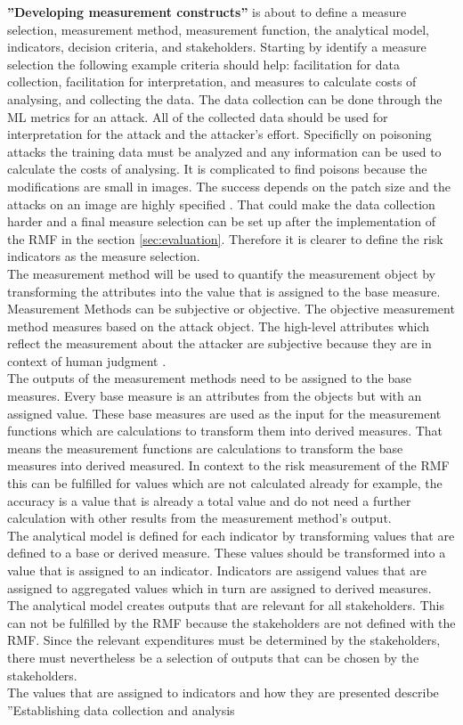 \textbf{''Developing measurement constructs''} is about to define a measure selection, measurement method, measurement function, the analytical model, indicators, decision criteria, and stakeholders. Starting by identify a measure selection the following example criteria should help: facilitation for data collection, facilitation for interpretation, and measures to calculate costs of analysing, and collecting the data. The data collection can be done through the ML metrics for an attack. All of the collected data should be used for interpretation for the attack and the attacker's effort. Specificlly on poisoning attacks the training data must be analyzed and any information can be used to calculate the costs of analysing. It is complicated to find poisons because the modifications are small in images. The success depends on the patch size and the attacks on an image are highly specified \cite{DBLP:conf/icml/SchwarzschildGG21}. That could make the data collection harder and a final measure selection can be set up after the implementation of the RMF in the section \ref{sec:evaluation}. Therefore it is clearer to define the risk indicators as the measure selection. \\ The measurement method will be used to quantify the measurement object by transforming the attributes into the value that is assigned to the base measure. Measurement Methods can be subjective or objective. The objective measurement method measures based on the attack object. The high-level attributes which reflect the measurement about the attacker are subjective because they are in context of human judgment \cite{DBLP:conf/crisis/DoynikovaNGK20}. \\ The outputs of the measurement methods need to be assigned to the base measures. Every base measure is an attributes from the objects but with an assigned value. These base measures are used as the input for the measurement functions which are calculations to transform them into derived measures. That means the measurement functions are calculations to transform the base measures into derived measured. In context to the risk measurement of the RMF this can be fulfilled for values which are not calculated already for example, the accuracy is a value that is already a total value \cite{9783960101925} and do not need a further calculation with other results from the measurement method's output. \\ The analytical model is defined for each indicator by transforming values that are defined to a base or derived measure. These values should be transformed into a value that is assigned to an indicator. Indicators are assigend values that are assigned to aggregated values which in turn are assigned to derived measures. The analytical model creates outputs that are relevant for all stakeholders. This can not be fulfilled by the RMF because the stakeholders are not defined with the RMF. Since the relevant expenditures must be determined by the stakeholders, there must nevertheless be a selection of outputs that can be chosen by the stakeholders. \\ The values that are assigned to indicators and how they are presented describe ''Establishing data collection and analysis 